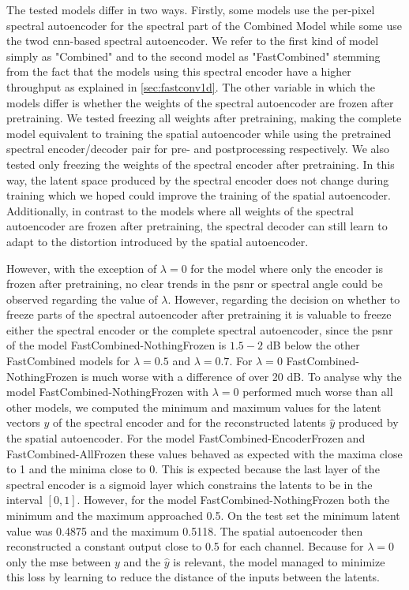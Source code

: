 The tested models differ in two ways. Firstly, some models use the per-pixel spectral autoencoder for the spectral part of the Combined Model while some use the \ac{twod} \ac{cnn}-based spectral autoencoder. We refer to the first kind of model simply as "Combined" and to the second model as "FastCombined" stemming from the fact that the models using this spectral encoder have a higher throughput as explained in \autoref{sec:fastconv1d}. The other variable in which the models differ is whether the weights of the spectral autoencoder are frozen after pretraining. We tested freezing all weights after pretraining, making the complete model equivalent to training the spatial autoencoder while using the pretrained spectral encoder/decoder pair for pre- and postprocessing respectively. We also tested only freezing the weights of the spectral encoder after pretraining. In this way, the latent space produced by the spectral encoder does not change during training which we hoped could improve the training of the spatial autoencoder. Additionally, in contrast to the models where all weights of the spectral autoencoder are frozen after pretraining, the spectral decoder can still learn to adapt to the distortion introduced by the spatial autoencoder.

However, with the exception of $\lambda=0$ for the model where only the encoder is frozen after pretraining, no clear trends in the \ac{psnr} or spectral angle could be observed regarding the value of $\lambda$. However, regarding the decision on whether to freeze parts of the spectral autoencoder after pretraining it is valuable to freeze either the spectral encoder or the complete spectral autoencoder, since the \ac{psnr} of the model FastCombined-NothingFrozen is $1.5-2$ dB below the other FastCombined models for $\lambda = 0.5$ and $\lambda = 0.7$. For $\lambda=0$ FastCombined-NothingFrozen is much worse with a difference of over 20 dB. To analyse why the model FastCombined-NothingFrozen with $\lambda=0$ performed much worse than all other models, we computed the minimum and maximum values for the latent vectors $y$ of the spectral encoder and for the reconstructed latents $\hat{y}$ produced by the spatial autoencoder. For the model FastCombined-EncoderFrozen and FastCombined-AllFrozen these values behaved as expected with the maxima close to 1 and the minima close to 0. This is expected because the last layer of the spectral encoder is a sigmoid layer which constrains the latents to be in the interval $[0,1]$. However, for the model FastCombined-NothingFrozen both the minimum and the maximum approached 0.5. On the test set the minimum latent value was 0.4875 and the maximum 0.5118. The spatial autoencoder then reconstructed a constant output close to 0.5 for each channel. Because for $\lambda=0$ only the \ac{mse} between $y$ and the $\hat{y}$ is relevant, the model managed to minimize this loss by learning to reduce the distance of the inputs between the latents.

